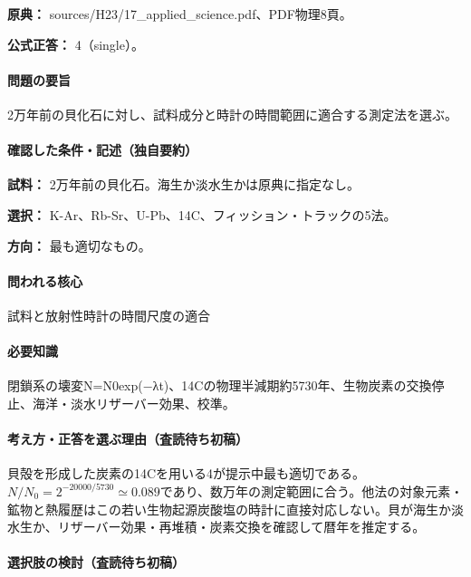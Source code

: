\noindent\textbf{原典：} sources/H23/17\_applied\_science.pdf、PDF物理8頁。

\textbf{公式正答：} 4（single）。

\paragraph{問題の要旨} 2万年前の貝化石に対し、試料成分と時計の時間範囲に適合する測定法を選ぶ。

\paragraph{確認した条件・記述（独自要約）}\mbox{}\par

\noindent\textbf{試料：} 2万年前の貝化石。海生か淡水生かは原典に指定なし。\par

\noindent\textbf{選択：} K-Ar、Rb-Sr、U-Pb、14C、フィッション・トラックの5法。\par

\noindent\textbf{方向：} 最も適切なもの。\par

\paragraph{問われる核心} 試料と放射性時計の時間尺度の適合

\paragraph{必要知識} 閉鎖系の壊変N=\allowbreak{}N0exp(−λt)、14Cの物理半減期約5730年、生物炭素の交換停止、海洋・淡水リザーバー効果、校準。

\paragraph{考え方・正答を選ぶ理由（査読待ち初稿）} 貝殻を形成した炭素の14Cを用いる4が提示中最も適切である。\(N/N_0=2^{-20000/5730}\simeq0.089\)であり、数万年の測定範囲に合う。他法の対象元素・鉱物と熱履歴はこの若い生物起源炭酸塩の時計に直接対応しない。貝が海生か淡水生か、リザーバー効果・再堆積・炭素交換を確認して暦年を推定する。

\paragraph{選択肢の検討（査読待ち初稿）}\mbox{}\par

